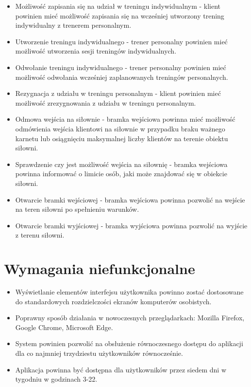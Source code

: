 \documentclass[a4paper,twoside,12pt]{book}
\begin{document}
\begin{itemize}
			\item Możliwość zapisania się na udział w treningu indywidualnym - klient powinien mieć możliwość zapisania się na wcześniej utworzony trening indywidualny z trenerem personalnym.
			\item Utworzenie treningu indywidualnego - trener personalny powinien mieć możliwość utworzenia sesji treningów indywidualnych.
			\item Odwołanie treningu indywidualnego - trener personalny powinien mieć możliwość odwołania wcześniej zaplanowanych treningów personalnych.
			\item Rezygnacja z udziału w treningu personalnym - klient powinien mieć możliwość zrezygnowania z udziału w treningu personalnym.
			\item Odmowa wejścia na siłownie - bramka wejściowa powinna mieć możliwość odmówienia wejścia klientowi na siłownie w przypadku braku ważnego karnetu lub osiągnięciu maksymalnej liczby klientów na terenie obiektu siłowni.
			\item Sprawdzenie czy jest możliwość wejścia na siłownię - bramka wejściowa powinna informować o limicie osób, jaki może znajdować się w obiekcie siłowni.
			\item Otwarcie bramki wejściowej - bramka wejściowa powinna pozwolić na wejście na teren siłowni po spełnieniu warunków.
			\item Otwarcie bramki wyjściowej - bramka wyjściowa powinna pozwolić na wyjście z terenu siłowni.
		\end{itemize}
			
	\section {Wymagania niefunkcjonalne}
		\begin {itemize}
			\item Wyświetlanie elementów interfejsu użytkownika powinno zostać dostosowane do standardowych rozdzielczości ekranów komputerów osobistych.
			\item Poprawny sposób działania w nowoczesnych przeglądarkach: Mozilla Firefox, Google Chrome, Microsoft Edge.
			\item System powinien pozwolić na obsłużenie równoczesnego dostępu do aplikacji dla co najmniej trzydziestu użytkowników równocześnie.
			\item Aplikacja powinna być dostępna dla użytkowników przez siedem dni w tygodniu w godzinach 3-22.
		\end{itemize}
	
\end{document}
